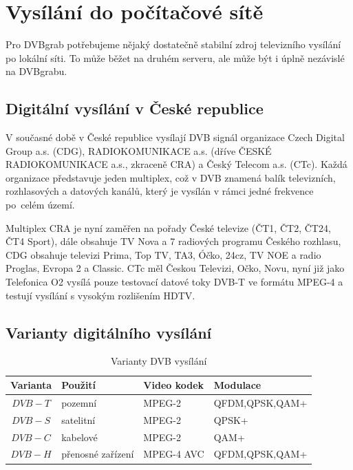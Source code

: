 \chapter{Vysílání do počítačové sítě}
Pro DVBgrab potřebujeme nějaký dostatečně stabilní zdroj televizního vysílání po lokální síti. To může běžet na druhém serveru, ale může být i úplně nezávislé na DVBgrabu.

\section{Digitální vysílání v České republice}
V současné době v České republice vysílají DVB signál organizace Czech Digital Group a.s. (CDG), RADIOKOMUNIKACE a.s. (dříve ČESKÉ RADIOKOMUNIKACE a.s., zkraceně CRA) a Český Telecom a.s. (CTc). Každá organizace představuje jeden multiplex, což v DVB znamená balík televizních, rozhlasových a datových kanálů, který je vysílán v rámci jedné frekvence po~celém území.

Multiplex CRA je nyní zaměřen na pořady České televize (ČT1, ČT2, ČT24, ČT4 Sport), dále obsahuje TV Nova a 7 radiových programu Českého rozhlasu, CDG obsahuje televizi Prima, Top TV, TA3, Óčko, 24cz, TV NOE a radio Proglas, Evropa 2 a Classic. CTc měl Českou Televizi, Očko, Novu, nyní již jako Telefonica O2 vysílá pouze testovací datové toky DVB-T ve formátu MPEG-4 a testují vysílání s vysokým rozlišením HDTV.

\section{Varianty digitálního vysílání}
\begin{table}[ht]
\begin{center}
\begin{tabular}{|c|l|l|l|}
\hline
\bf{Varianta} & \bf{Použití} & \bf{Video kodek} & \bf{Modulace} \\
\hline
$DVB-T$ & pozemní & MPEG-2 & QFDM,QPSK,QAM+\\
\hline
$DVB-S$ & satelitní & MPEG-2 & QPSK+\\
\hline
$DVB-C$ & kabelové & MPEG-2 & QAM+\\
\hline
$DVB-H$ & přenosné zařízení & MPEG-4 AVC & QFDM,QPSK,QAM+\\
\hline
\end{tabular}
\end{center}
\caption{Varianty DVB vysílání}
\label{tab:tab1}
\end{table}

